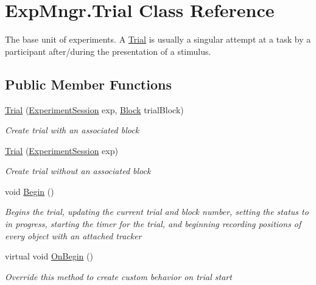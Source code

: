 \hypertarget{class_exp_mngr_1_1_trial}{}\section{Exp\+Mngr.\+Trial Class Reference}
\label{class_exp_mngr_1_1_trial}


The base unit of experiments. A \hyperlink{class_exp_mngr_1_1_trial}{Trial} is usually a singular attempt at a task by a participant after/during the presentation of a stimulus.  


\subsection*{Public Member Functions}
\begin{DoxyCompactItemize}
\item 
\hyperlink{class_exp_mngr_1_1_trial_ad9a26c84544d95c3fbfd3344ef1ac46b}{Trial} (\hyperlink{class_exp_mngr_1_1_experiment_session}{Experiment\+Session} exp, \hyperlink{class_exp_mngr_1_1_block}{Block} trial\+Block)
\begin{DoxyCompactList}\small\item\em Create trial with an associated block \end{DoxyCompactList}\item 
\hyperlink{class_exp_mngr_1_1_trial_a7d8023ebd830604a202875026a47187b}{Trial} (\hyperlink{class_exp_mngr_1_1_experiment_session}{Experiment\+Session} exp)
\begin{DoxyCompactList}\small\item\em Create trial without an associated block \end{DoxyCompactList}\item 
void \hyperlink{class_exp_mngr_1_1_trial_a4281bab345d041e995132d16462b056e}{Begin} ()
\begin{DoxyCompactList}\small\item\em Begins the trial, updating the current trial and block number, setting the status to in progress, starting the timer for the trial, and beginning recording positions of every object with an attached tracker \end{DoxyCompactList}\item 
virtual void \hyperlink{class_exp_mngr_1_1_trial_ae187535e400451e0df950a4c7a5fe0bc}{On\+Begin} ()
\begin{DoxyCompactList}\small\item\em Override this method to create custom behavior on trial start \end{DoxyCompactList}\item 

\end{DoxyCompactItemize}
